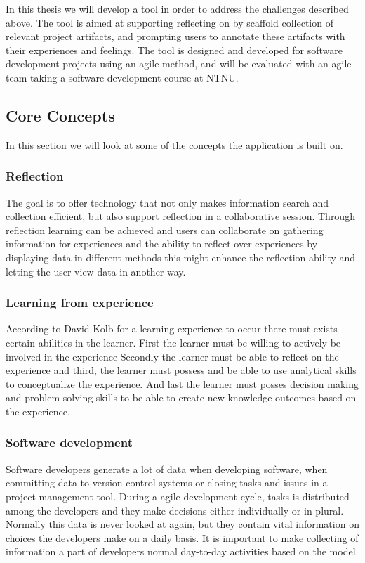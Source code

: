 In this thesis we will develop a tool in order to address the challenges described above. The tool is aimed at supporting reflecting on by scaffold collection of relevant project artifacts, and prompting users to annotate these artifacts with their experiences and feelings. The tool is designed and developed for software development projects using an agile method, and will be evaluated with an agile team taking a software development course at NTNU. 

\subsection{Core Concepts}
In this section we will look at some of the concepts the application is built on.

\subsubsection{Reflection}
The goal is to offer technology that not only makes information search and collection efficient, but also support reflection in a collaborative session. Through reflection learning can be achieved and users can collaborate on gathering information for experiences and the ability to reflect over experiences by displaying data in different methods this might enhance the reflection ability and letting the user view data in another way.

\subsubsection{Learning from experience}
According to David Kolb\citep{KolbModel} for a learning experience to occur there must exists certain abilities in the learner. First the learner must be willing to actively be involved in the experience Secondly the learner must be able to reflect on the experience and third, the learner must possess and be able to use analytical skills to conceptualize the experience. And last the learner must posses decision making and problem solving skills to be able to create new knowledge outcomes based on the experience.

\subsubsection{Software development}
Software developers generate a lot of data when developing software, when committing data to version control systems or closing tasks and issues in a project management tool. During a agile development cycle, tasks is distributed among the developers and they make decisions either individually or in plural. Normally this data is never looked at again, but they contain vital information on choices the developers make on a daily basis. It is important to make collecting of information a part of developers normal day-to-day activities based on the model\citep{Krogstie2009}.

